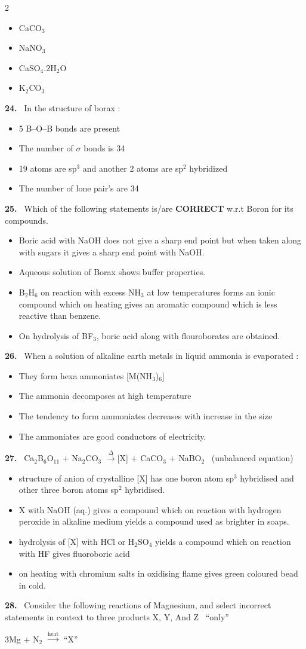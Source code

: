 \documentclass[10pt]{extarticle}
\newcommand{\qn}[1]{\par\smallskip\noindent\textbf{#1.}~}
\newenvironment{qoptions}{\begin{itemize}[leftmargin=1.8em,itemsep=1pt,topsep=2pt,label={}]}{\end{itemize}}
\newcommand{\opt}[2]{\item[(#1)] #2}
\begin{document}
\begin{multicols}{2}
\begin{qoptions}
\opt{A}{CaCO$_3$}
\opt{B}{NaNO$_3$}
\opt{C}{CaSO$_4$.2H$_2$O}
\opt{D}{K$_2$CO$_3$}
\end{qoptions}
\qn{24} In the structure of borax :
\begin{qoptions}
\opt{A}{5 B--O--B bonds are present}
\opt{B}{The number of $\sigma$ bonds is 34}
\opt{C}{19 atoms are sp$^3$ and another 2 atoms are sp$^2$ hybridized}
\opt{D}{The number of lone pair's are 34}
\end{qoptions}
\qn{25} Which of the following statements is/are \textbf{CORRECT} w.r.t Boron for its compounds.
\begin{qoptions}
\opt{A}{Boric acid with NaOH does not give a sharp end point but when taken along with sugars it gives a sharp end point with NaOH.}
\opt{B}{Aqueous solution of Borax shows buffer properties.}
\opt{C}{B$_2$H$_6$ on reaction with excess NH$_3$ at low temperatures forms an ionic compound which on heating gives an aromatic compound which is less reactive than benzene.}
\opt{D}{On hydrolysis of BF$_3$, boric acid along with flouroborates are obtained.}
\end{qoptions}
\qn{26} When a solution of alkaline earth metals in liquid ammonia is evaporated :
\begin{qoptions}
\opt{A}{They form hexa ammoniates [M(NH$_3$)$_6$]}
\opt{B}{The ammonia decomposes at high temperature}
\opt{C}{The tendency to form ammoniates decreases with increase in the size}
\opt{D}{The ammoniates are good conductors of electricity.}
\end{qoptions}
\qn{27} Ca$_2$B$_6$O$_{11}$ + Na$_2$CO$_3$ $\xrightarrow{\Delta}$[X] + CaCO$_3$ + NaBO$_2$ \ (unbalanced equation)
\begin{qoptions}
\opt{A}{structure of anion of crystalline [X] has one boron atom sp$^3$ hybridised and other three boron atoms sp$^2$ hybridised.}
\opt{B}{X with NaOH (aq.) gives a compound which on reaction with hydrogen peroxide in alkaline medium yields a compound used as brighter in soaps.}
\opt{C}{hydrolysis of [X] with HCl or H$_2$SO$_4$ yields a compound which on reaction with HF gives fluoroboric acid}
\opt{D}{[X] on heating with chromium salts in oxidising flame gives green coloured bead in cold.}
\end{qoptions}
\qn{28} Consider the following reactions of Magnesium, and select incorrect statements in context to three products X, Y, And Z \ ``only''\par
3Mg + N$_2$ $\xrightarrow{\text{heat}}$ ``X''\par

\end{multicols}
\end{document}
